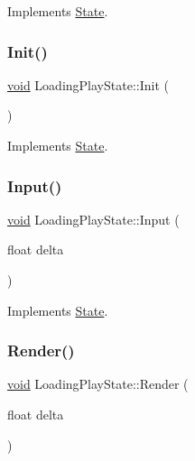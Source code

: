 Implements \hyperlink{classState_ade502eaa386d570e526eb356ffd73fd8}{State}.

\mbox{\label{classLoadingPlayState_aaa131760db87f7dd206064105b53004c}} 
\subsubsection{\texorpdfstring{Init()}{Init()}}
{\footnotesize\ttfamily \hyperlink{imgui__impl__opengl3__loader_8h_ac668e7cffd9e2e9cfee428b9b2f34fa7}{void} Loading\+Play\+State\+::\+Init (\begin{DoxyParamCaption}{ }\end{DoxyParamCaption})\hspace{0.3cm}{\ttfamily [virtual]}}



Implements \hyperlink{classState_a7ab4d8c6aa239a17ed579d89a209b156}{State}.

\mbox{\label{classLoadingPlayState_a69ec7d3e42aa57e4db484e201aae3c63}} 
\subsubsection{\texorpdfstring{Input()}{Input()}}
{\footnotesize\ttfamily \hyperlink{imgui__impl__opengl3__loader_8h_ac668e7cffd9e2e9cfee428b9b2f34fa7}{void} Loading\+Play\+State\+::\+Input (\begin{DoxyParamCaption}\item[{float}]{delta }\end{DoxyParamCaption})\hspace{0.3cm}{\ttfamily [virtual]}}



Implements \hyperlink{classState_a1705412877f37a5cc8fc712542756076}{State}.

\mbox{\label{classLoadingPlayState_a9f52c378fd76e40eb366d6da2c57ab11}} 
\subsubsection{\texorpdfstring{Render()}{Render()}}
{\footnotesize\ttfamily \hyperlink{imgui__impl__opengl3__loader_8h_ac668e7cffd9e2e9cfee428b9b2f34fa7}{void} Loading\+Play\+State\+::\+Render (\begin{DoxyParamCaption}\item[{float}]{delta }\end{DoxyParamCaption})\hspace{0.3cm}{\ttfamily [virtual]}}



